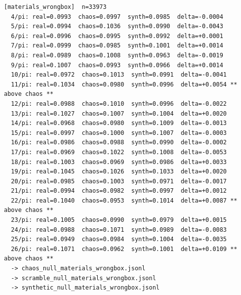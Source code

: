 \documentclass[11pt, letterpaper, openany]{book}
\begin{document}
\begin{empiricalbox}
\begin{lstlisting}[style=terminal]
[materials_wrongbox]  n=33973
  4/pi: real=0.0993  chaos=0.0997  synth=0.0985  delta=-0.0004
  5/pi: real=0.0994  chaos=0.1036  synth=0.0990  delta=-0.0043
  6/pi: real=0.0996  chaos=0.0995  synth=0.0992  delta=+0.0001
  7/pi: real=0.0999  chaos=0.0985  synth=0.1001  delta=+0.0014
  8/pi: real=0.0989  chaos=0.1008  synth=0.0963  delta=-0.0019
  9/pi: real=0.1007  chaos=0.0993  synth=0.0966  delta=+0.0014
  10/pi: real=0.0972  chaos=0.1013  synth=0.0991  delta=-0.0041
  11/pi: real=0.1034  chaos=0.0980  synth=0.0996  delta=+0.0054 ** above chaos **
  12/pi: real=0.0988  chaos=0.1010  synth=0.0996  delta=-0.0022
  13/pi: real=0.1027  chaos=0.1007  synth=0.1004  delta=+0.0020
  14/pi: real=0.0968  chaos=0.0980  synth=0.1009  delta=-0.0013
  15/pi: real=0.0997  chaos=0.1000  synth=0.1007  delta=-0.0003
  16/pi: real=0.0986  chaos=0.0988  synth=0.0990  delta=-0.0002
  17/pi: real=0.0969  chaos=0.1022  synth=0.1008  delta=-0.0053
  18/pi: real=0.1003  chaos=0.0969  synth=0.0986  delta=+0.0033
  19/pi: real=0.1045  chaos=0.1026  synth=0.1033  delta=+0.0020
  20/pi: real=0.0985  chaos=0.1003  synth=0.0971  delta=-0.0017
  21/pi: real=0.0994  chaos=0.0982  synth=0.0997  delta=+0.0012
  22/pi: real=0.1040  chaos=0.0953  synth=0.1014  delta=+0.0087 ** above chaos **
  23/pi: real=0.1005  chaos=0.0990  synth=0.0979  delta=+0.0015
  24/pi: real=0.0988  chaos=0.1071  synth=0.0989  delta=-0.0083
  25/pi: real=0.0949  chaos=0.0984  synth=0.1004  delta=-0.0035
  26/pi: real=0.1071  chaos=0.0962  synth=0.1001  delta=+0.0109 ** above chaos **
  -> chaos_null_materials_wrongbox.jsonl
  -> scramble_null_materials_wrongbox.jsonl
  -> synthetic_null_materials_wrongbox.jsonl


\end{lstlisting}
\end{empiricalbox}
\end{document}
